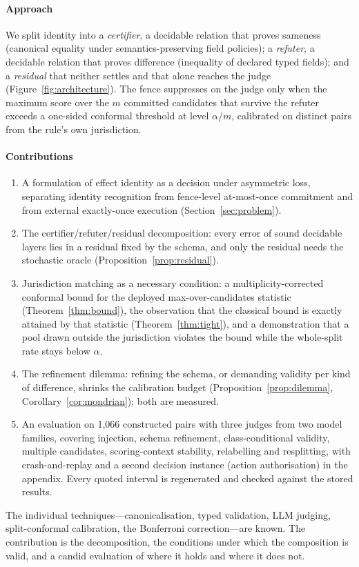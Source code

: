 \paragraph{Approach}
We split identity into a \emph{certifier}, a decidable relation that proves sameness (canonical equality under semantics-preserving field policies); a \emph{refuter}, a decidable relation that proves difference (inequality of declared typed fields); and a \emph{residual} that neither settles and that alone reaches the judge (Figure~\ref{fig:architecture}). The fence suppresses on the judge only when the maximum score over the $m$ committed candidates that survive the refuter exceeds a one-sided conformal threshold at level $\alpha/m$, calibrated on distinct pairs from the rule's own jurisdiction.

\paragraph{Contributions}
\begin{enumerate}[(C1),leftmargin=*,itemsep=1pt]
\item A formulation of effect identity as a decision under asymmetric loss, separating identity recognition from fence-level at-most-once commitment and from external exactly-once execution (Section~\ref{sec:problem}).
\item The certifier/refuter/residual decomposition: every error of sound decidable layers lies in a residual fixed by the schema, and only the residual needs the stochastic oracle (Proposition~\ref{prop:residual}).
\item Jurisdiction matching as a necessary condition: a multiplicity-corrected conformal bound for the deployed max-over-candidates statistic (Theorem~\ref{thm:bound}), the observation that the classical bound is exactly attained by that statistic (Theorem~\ref{thm:tight}), and a demonstration that a pool drawn outside the jurisdiction violates the bound while the whole-split rate stays below $\alpha$.
\item The refinement dilemma: refining the schema, or demanding validity per kind of difference, shrinks the calibration budget (Proposition~\ref{prop:dilemma}, Corollary~\ref{cor:mondrian}); both are measured.
\item An evaluation on 1,066 constructed pairs with three judges from two model families, covering injection, schema refinement, class-conditional validity, multiple candidates, scoring-context stability, relabelling and resplitting, with crash-and-replay and a second decision instance (action authorisation) in the appendix. Every quoted interval is regenerated and checked against the stored results.
\end{enumerate}
The individual techniques---canonicalisation, typed validation, LLM judging, split-conformal calibration, the Bonferroni correction---are known. The contribution is the decomposition, the conditions under which the composition is valid, and a candid evaluation of where it holds and where it does not.
